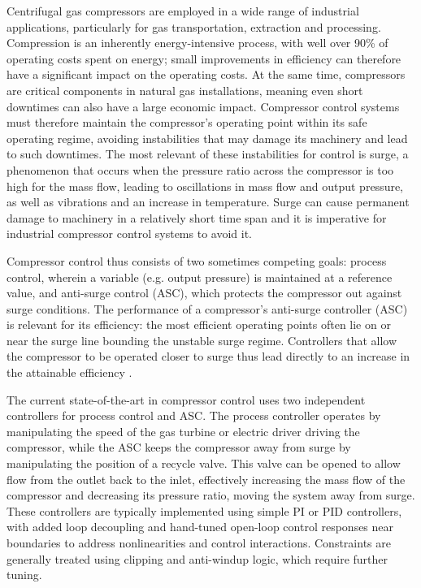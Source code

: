 Centrifugal gas compressors are employed in a wide range of industrial applications, particularly for gas transportation, extraction and processing.
Compression is an inherently energy-intensive process, with well over 90\% of operating costs spent on energy; small improvements in efficiency can therefore have a significant impact on the operating costs.
At the same time, compressors are critical components in natural gas installations, meaning even short downtimes can also have a large economic impact.
Compressor control systems must therefore maintain the compressor's operating point within its safe operating regime, avoiding instabilities that may damage its machinery and lead to such downtimes.
The most relevant of these instabilities for control is surge, a phenomenon that occurs when the pressure ratio across the compressor is too high for the mass flow, leading to oscillations in mass flow and output pressure, as well as vibrations and an increase in temperature.
Surge can cause permanent damage to machinery in a relatively short time span and it is imperative for industrial compressor control systems to avoid it.

Compressor control thus consists of two sometimes competing goals: process control, wherein a variable (e.g. output pressure) is maintained at a reference value, and anti-surge control (ASC), which protects the compressor out against surge conditions.
The performance of a compressor's anti-surge controller (ASC) is relevant for its efficiency: the most efficient operating points often lie on or near the surge line bounding the unstable surge regime.
Controllers that allow the compressor to be operated closer to surge thus lead directly to an increase in the attainable efficiency \cite{Cortinovis2014}.

The current state-of-the-art in compressor control uses two independent controllers for process control and ASC.
The process controller operates by manipulating the speed of the gas turbine or electric driver driving the compressor, while the ASC keeps the compressor away from surge by manipulating the position of a recycle valve.
This valve can be opened to allow flow from the outlet back to the inlet, effectively increasing the mass flow of the compressor and decreasing its pressure ratio, moving the system away from surge.
These controllers are typically implemented using simple PI or PID controllers, with added loop decoupling and hand-tuned open-loop control responses near boundaries to address nonlinearities and control interactions.
Constraints are generally treated using clipping and anti-windup logic, which require further tuning.

